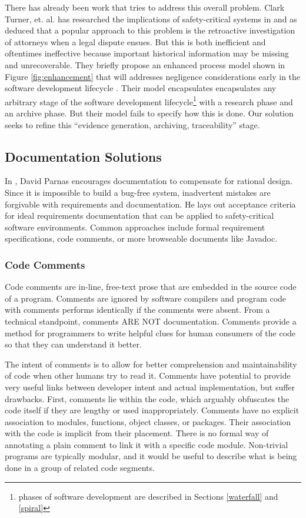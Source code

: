 There has already been work that tries to address this overall problem. Clark
Turner, et. al. has researched the implications of safety-critical systems in
\cite{Turner1996, Turner2000, Turner2001} and as deduced that a popular
approach to this problem is the retroactive investigation of attorneys when a
legal dispute ensues. But this is both inefficient and oftentimes ineffective
because important historical information may be missing and unrecoverable. They
briefly propose an enhanced process model shown in Figure \ref{fig:enhancement}
that will addresses negligence considerations early in the software development
lifecycle \cite{Turner2001}. Their model encapsulates encapsulates any arbitrary
stage of the software development lifecycle\footnote{phases of software
development are described in Sections \ref{waterfall} and \ref{spiral}} with a
research phase and an archive phase. But their model fails to specify how this
is done. Our solution seeks to refine this ``evidence generation, archiving,
traceability'' stage.

\subsection{Documentation Solutions}

In \cite{Parnas1986}, David Parnas encourages documentation to compensate for
rational design. Since it is impossible to build a bug-free system, inadvertent
mistakes are forgivable with requirements and documentation. He lays out
acceptance criteria for ideal requirements documentation that can be applied to
safety-critical software environments. Common approaches include formal
requirement specifications, code comments, or more browseable documents like
Javadoc\cite{Javadoc}.

\subsubsection*{Code Comments}
Code comments are in-line, free-text prose that are embedded in the source code
of a program. Comments are ignored by software compilers and program code with
comments performs identically if the comments were absent. From a technical
standpoint, comments ARE NOT documentation. Comments provide a method for
programmers to write helpful clues for human consumers of the code so that they
can understand it better.

The intent of comments is to allow for better comprehension and maintainability
of code when other humans try to read it. Comments have potential to provide
very useful links between developer intent and actual implementation, but suffer
drawbacks. First, comments lie within the code, which arguably obfuscates the
code itself if they are lengthy or used inappropriately. Comments have no
explicit association to modules, functions, object classes, or packages. Their
association with the code is implicit from their placement. There is no formal
way of annotating a plain comment to link it with a specific code module.
Non-trivial programs are typically modular, and it would be useful to describe
what is being done in a group of related code segments.

